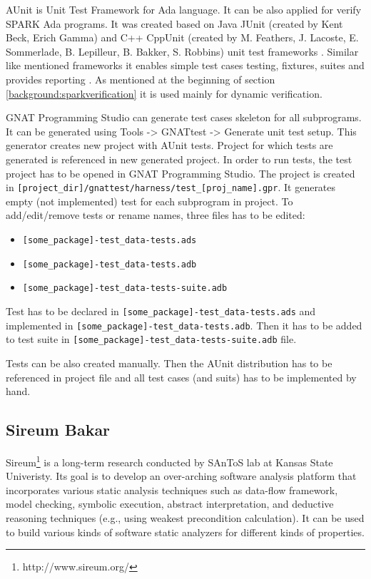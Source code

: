 AUnit is Unit Test Framework for Ada language. It can be also applied for verify SPARK Ada programs. It was created based on Java JUnit (created by Kent Beck, Erich Gamma) and C++ CppUnit (created by M. Feathers, J. Lacoste, E. Sommerlade, B. Lepilleur, B. Bakker, S. Robbins) unit test frameworks \cite{AUnitCookbook:Online}. Similar like mentioned frameworks it enables simple test cases testing, fixtures, suites and provides reporting \cite{AUnitTutorials:Online}. As mentioned at the beginning of section \ref{background:sparkverification} it is used mainly for dynamic verification.

GNAT Programming Studio can generate test cases skeleton for all subprograms. It can be generated using Tools -> GNATtest -> Generate unit test setup. This generator creates new project with AUnit tests. Project for which tests are generated is referenced in new generated project. In order to run tests, the test project has to be opened in GNAT Programming Studio. The project is created in \lstinline{[project_dir]/gnattest/harness/test_[proj_name].gpr}. It generates empty (not implemented) test for each subprogram in project. To add/edit/remove tests or rename names, three files has to be edited:

\begin{itemize}
    \item \lstinline{[some_package]-test_data-tests.ads}
    \item \lstinline{[some_package]-test_data-tests.adb}
    \item \lstinline{[some_package]-test_data-tests-suite.adb}
\end{itemize}

Test has to be declared in \lstinline{[some_package]-test_data-tests.ads} and implemented in \lstinline{[some_package]-test_data-tests.adb}. Then it has to be added to test suite in \lstinline{[some_package]-test_data-tests-suite.adb} file.

Tests can be also created manually. Then the AUnit distribution has to be referenced in project file and all test cases (and suits) has to be implemented by hand.


\subsection{Sireum Bakar}
\label{background:spark:sireum}

Sireum\footnote{http://www.sireum.org/} is a long-term research conducted by SAnToS lab at Kansas State Univeristy. Its goal is to develop an over-arching software analysis platform that incorporates various static analysis techniques such as data-flow framework, model checking, symbolic execution, abstract interpretation, and deductive reasoning techniques (e.g., using weakest precondition calculation). It can be used to build various kinds of software static analyzers for different kinds of properties. 


